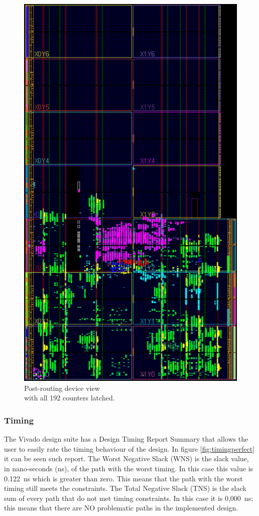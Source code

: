 \begin{figure}[H]
\begin{minipage}{.5\textwidth}
		\includegraphics[width=.85\linewidth]{IMG/ch4/routed_colored_perfect}
		\caption{Post-routing device view\\ with all 192 counters latched.}
		\label{fig:allcounters}
	\end{minipage}
\end{figure}
\subsubsection{Timing}
\noindent The Vivado design suite has a Design Timing Report Summary that allows the user to easily rate the timing behaviour of the design.
In figure \ref{fig:timingperfect} it can be seen such report.
The Worst Negative Slack (WNS) is the slack value, in nano-seconds (ns), of the path with the worst timing. In this case this value is 0.122~ns which is greater than zero. This means that the path with the worst timing still meets the constraints.
The Total Negative Slack (TNS) is the slack sum of every path that do not met timing constraints. In this case it is 0,000~ns; this means that there are NO problematic paths in the implemented design.

